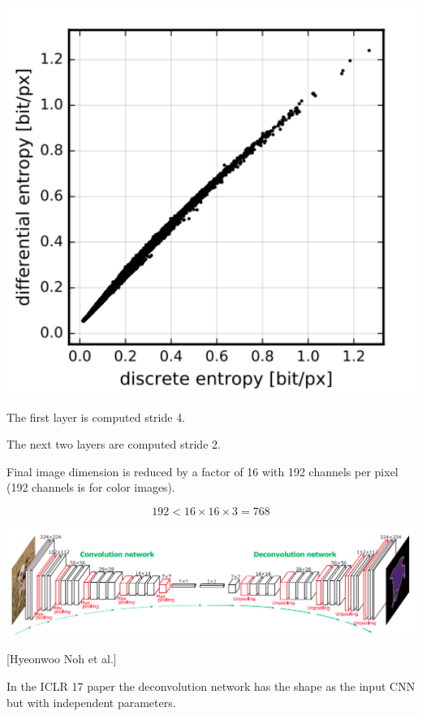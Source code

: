 {\bigskip
\centerline{\includegraphics[height=5in]{../images/RateDist6}}



\vfill
The first layer is computed stride 4.

\vfill
The next two layers are computed stride 2.

\vfill
Final image dimension is reduced by a factor of 16 with 192 channels per pixel (192 channels is for color images).

\vfill
$$192 < 16 \times 16 \times 3 = 768$$

\vfill



\centerline{\includegraphics[width=9in]{../images/Deconv}}
\centerline{[Hyeonwoo Noh et al.]}

\vfill
In the ICLR 17 paper the deconvolution network has the shape as the input CNN but with independent parameters.


}
